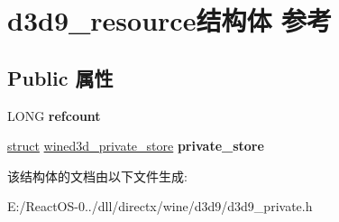 \hypertarget{structd3d9__resource}{}\section{d3d9\+\_\+resource结构体 参考}
\label{structd3d9__resource}
\subsection*{Public 属性}
\begin{DoxyCompactItemize}
\item 
\mbox{\label{structd3d9__resource_aa5bbdfd505d3e462e2d38c9c2b74b0be}} 
L\+O\+NG {\bfseries refcount}
\item 
\mbox{\label{structd3d9__resource_a2f0a29236a0d478ae33a9f1e7d7d0a70}} 
\hyperlink{interfacestruct}{struct} \hyperlink{structwined3d__private__store}{wined3d\+\_\+private\+\_\+store} {\bfseries private\+\_\+store}
\end{DoxyCompactItemize}


该结构体的文档由以下文件生成\+:\begin{DoxyCompactItemize}
\item 
E\+:/\+React\+O\+S-\/0../dll/directx/wine/d3d9/d3d9\+\_\+private.\+h\end{DoxyCompactItemize}
